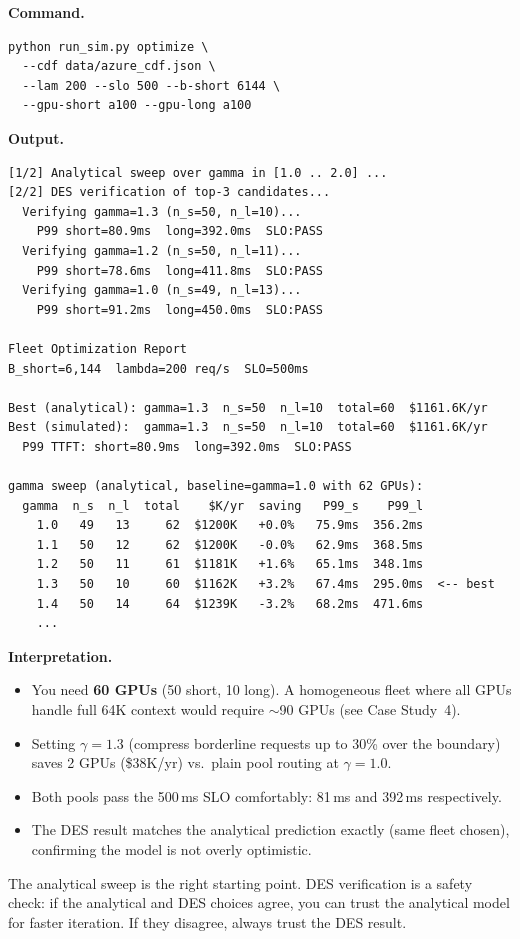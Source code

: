 \documentclass[11pt,a4paper]{article}
\begin{document}
\textbf{Command.}
\begin{lstlisting}[style=shell]
python run_sim.py optimize \
  --cdf data/azure_cdf.json \
  --lam 200 --slo 500 --b-short 6144 \
  --gpu-short a100 --gpu-long a100
\end{lstlisting}

\textbf{Output.}
\begin{lstlisting}[style=output]
[1/2] Analytical sweep over gamma in [1.0 .. 2.0] ...
[2/2] DES verification of top-3 candidates...
  Verifying gamma=1.3 (n_s=50, n_l=10)...
    P99 short=80.9ms  long=392.0ms  SLO:PASS
  Verifying gamma=1.2 (n_s=50, n_l=11)...
    P99 short=78.6ms  long=411.8ms  SLO:PASS
  Verifying gamma=1.0 (n_s=49, n_l=13)...
    P99 short=91.2ms  long=450.0ms  SLO:PASS

Fleet Optimization Report
B_short=6,144  lambda=200 req/s  SLO=500ms

Best (analytical): gamma=1.3  n_s=50  n_l=10  total=60  $1161.6K/yr
Best (simulated):  gamma=1.3  n_s=50  n_l=10  total=60  $1161.6K/yr
  P99 TTFT: short=80.9ms  long=392.0ms  SLO:PASS

gamma sweep (analytical, baseline=gamma=1.0 with 62 GPUs):
  gamma  n_s  n_l  total    $K/yr  saving   P99_s    P99_l
    1.0   49   13     62  $1200K   +0.0%   75.9ms  356.2ms
    1.1   50   12     62  $1200K   -0.0%   62.9ms  368.5ms
    1.2   50   11     61  $1181K   +1.6%   65.1ms  348.1ms
    1.3   50   10     60  $1162K   +3.2%   67.4ms  295.0ms  <-- best
    1.4   50   14     64  $1239K   -3.2%   68.2ms  471.6ms
    ...
\end{lstlisting}

\textbf{Interpretation.}
\begin{itemize}[nosep]
  \item You need \textbf{60 GPUs} (50 short, 10 long).  A homogeneous
    fleet where all GPUs handle full 64K context would require $\sim$90
    GPUs (see Case Study~4).
  \item Setting $\gamma = 1.3$ (compress borderline requests up to
    30\% over the boundary) saves 2 GPUs (\$38K/yr) vs.\ plain pool
    routing at $\gamma = 1.0$.
  \item Both pools pass the 500\,ms SLO comfortably: 81\,ms and
    392\,ms respectively.
  \item The DES result matches the analytical prediction exactly
    (same fleet chosen), confirming the model is not overly optimistic.
\end{itemize}

\begin{keyinsight}
  The analytical sweep is the right starting point.
  DES verification is a safety check: if the analytical and DES
  choices agree, you can trust the analytical model for faster
  iteration.  If they disagree, always trust the DES result.
\end{keyinsight}
\end{document}
